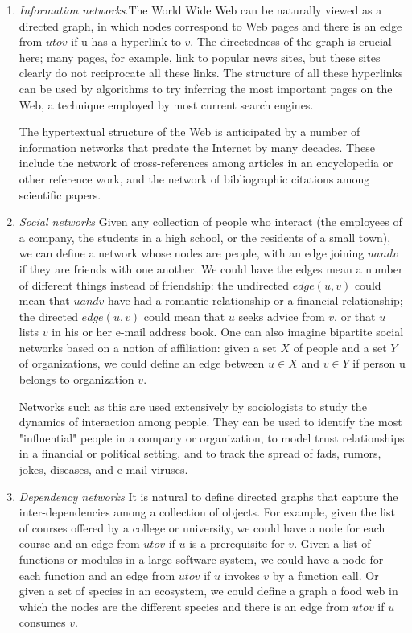 \documentclass[12pt,a4paper]{book}
\begin{document}
\begin{enumerate}
\item \textit{Information networks}.The World Wide Web can be naturally viewed as a directed graph, in which nodes correspond to Web pages and there is an edge from $u to v$ if u has a hyperlink to $v$. The directedness of the graph is crucial here; many pages, for example, link to popular news sites, but these sites clearly do not reciprocate all these links. The structure of all these hyperlinks can be used by algorithms to try inferring the most important pages on the Web, a technique employed by most current search engines.\par
The hypertextual structure of the Web is anticipated by a number of information networks that predate the Internet by many decades. These include the network of cross-references among articles in an encyclopedia or other reference work, and the network of bibliographic citations among scientific papers.
\item \textit{Social networks} Given any collection of people who interact (the employees of a company, the students in a high school, or the residents of a small town), we can define a network whose nodes are people, with an edge joining $u and v$ if they are friends with one another. We could have the edges mean a number of different things instead of friendship: the undirected $edge(u, v) $ could mean that $u and v$ have had a romantic relationship or a financial relationship; the directed $edge(u, v)$ could mean that $u$ seeks advice from $v$, or that $u$ lists $v$ in his or her e-mail address book. One can also imagine bipartite social networks based on a notion of affiliation: given a set $X$ of people and a set $Y$ of organizations, we could define an edge between $u \in X$ and $v \in Y$ if person u belongs to organization $v$.
\par Networks such as this are used extensively by sociologists to study the dynamics of interaction among people. They can be used to identify the most "influential" people in a company or organization, to model trust relationships in a financial or political setting, and to track the spread of fads, rumors, jokes, diseases, and e-mail viruses.
\item \textit{Dependency networks} It is natural to define directed graphs that capture the inter-dependencies among a collection of objects. For example, given the list of courses offered by a college or university, we could have a node for each course and an edge from $u to v$ if $u$ is a prerequisite for $v$. Given a list of functions or modules in a large software system, we could have a node for each function and an edge from $u to v$ if $u$ invokes $v$ by a function call. Or given a set of species in an ecosystem, we could define a graph a food web in which the nodes are the different species and there is an edge from $u to v$ if $u$ consumes $v$.
\end{enumerate}
\end{document}
